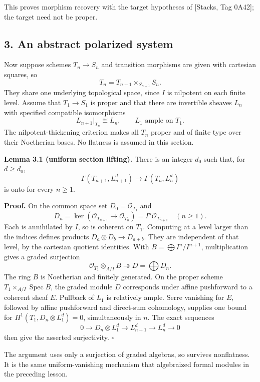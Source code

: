\documentclass[11pt]{article}
\begin{document}
This proves morphism recovery with the target hypotheses of {[}Stacks,
Tag 0A42{]}; the target need not be proper.

\subsection{3. An abstract polarized
system}\label{an-abstract-polarized-system}

Now suppose schemes \(T_n\to S_n\) and transition morphisms are given
with cartesian squares, so \[
T_n=T_{n+1}\times_{S_{n+1}}S_n.
\] They share one underlying topological space, since \(I\) is nilpotent
on each finite level. Assume that \(T_1\to S_1\) is proper and that
there are invertible sheaves \(L_n\) with specified compatible
isomorphisms \[
L_{n+1}|_{T_n}\cong L_n,
\qquad L_1\text{ ample on }T_1.
\] The nilpotent-thickening criterion makes all \(T_n\) proper and of
finite type over their Noetherian bases. No flatness is assumed in this
section.

\textbf{Lemma 3.1 (uniform section lifting).} There is an integer
\(d_0\) such that, for \(d\geq d_0\), \[
\Gamma(T_{n+1},L_{n+1}^d)\longrightarrow\Gamma(T_n,L_n^d)
\] is onto for every \(n\geq1\).

\textbf{Proof.} On the common space set \(D_0=\mathcal O_{T_1}\) and \[
D_n=\ker(\mathcal O_{T_{n+1}}\to\mathcal O_{T_n})
=I^n\mathcal O_{T_{n+1}}\quad(n\geq1).
\] Each is annihilated by \(I\), so is coherent on \(T_1\). Computing at
a level larger than the indices defines products
\(D_a\otimes D_b\to D_{a+b}\). They are independent of that level, by
the cartesian quotient identities. With \(B=\bigoplus I^n/I^{n+1}\),
multiplication gives a graded surjection \[
\mathcal O_{T_1}\otimes_{A/I}B\twoheadrightarrow D=\bigoplus D_n.
\] The ring \(B\) is Noetherian and finitely generated. On the proper
scheme \(T_1\times_{A/I}\operatorname{Spec}B\), the graded module \(D\)
corresponds under affine pushforward to a coherent sheaf \(E\). Pullback
of \(L_1\) is relatively ample. Serre vanishing for \(E\), followed by
affine pushforward and direct-sum cohomology, supplies one bound for
\(H^1(T_1,D_n\otimes L_1^d)=0\), simultaneously in \(n\). The exact
sequences \[
0\to D_n\otimes L_1^d\to L_{n+1}^d\to L_n^d\to0
\] then give the asserted surjectivity. \(\square\)

The argument uses only a surjection of graded algebras, so survives
nonflatness. It is the same uniform-vanishing mechanism that algebraized
formal modules in the preceding lesson.
\end{document}

